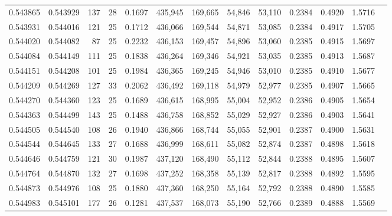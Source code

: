 \begin{tabular}{rrrrrrrrrrrrr}
0.543865 & 0.543929 & 137 &  28 &                                     0.1697 & 435,945 & 169,665 &  54,846 &  53,110 & 0.2384 & 0.4920 & 1.5716 \\
0.543931 & 0.544016 & 121 &  25 &                                     0.1712 & 436,066 & 169,544 &  54,871 &  53,085 & 0.2384 & 0.4917 & 1.5705 \\
0.544020 & 0.544082 &  87 &  25 &                                     0.2232 & 436,153 & 169,457 &  54,896 &  53,060 & 0.2385 & 0.4915 & 1.5697 \\
0.544084 & 0.544149 & 111 &  25 &                                     0.1838 & 436,264 & 169,346 &  54,921 &  53,035 & 0.2385 & 0.4913 & 1.5687 \\
0.544151 & 0.544208 & 101 &  25 &                                     0.1984 & 436,365 & 169,245 &  54,946 &  53,010 & 0.2385 & 0.4910 & 1.5677 \\
0.544209 & 0.544269 & 127 &  33 &                                     0.2062 & 436,492 & 169,118 &  54,979 &  52,977 & 0.2385 & 0.4907 & 1.5665 \\
0.544270 & 0.544360 & 123 &  25 &                                     0.1689 & 436,615 & 168,995 &  55,004 &  52,952 & 0.2386 & 0.4905 & 1.5654 \\
0.544363 & 0.544499 & 143 &  25 &                                     0.1488 & 436,758 & 168,852 &  55,029 &  52,927 & 0.2386 & 0.4903 & 1.5641 \\
0.544505 & 0.544540 & 108 &  26 &                                     0.1940 & 436,866 & 168,744 &  55,055 &  52,901 & 0.2387 & 0.4900 & 1.5631 \\
0.544544 & 0.544645 & 133 &  27 &                                     0.1688 & 436,999 & 168,611 &  55,082 &  52,874 & 0.2387 & 0.4898 & 1.5618 \\
0.544646 & 0.544759 & 121 &  30 &                                     0.1987 & 437,120 & 168,490 &  55,112 &  52,844 & 0.2388 & 0.4895 & 1.5607 \\
0.544764 & 0.544870 & 132 &  27 &                                     0.1698 & 437,252 & 168,358 &  55,139 &  52,817 & 0.2388 & 0.4892 & 1.5595 \\
0.544873 & 0.544976 & 108 &  25 &                                     0.1880 & 437,360 & 168,250 &  55,164 &  52,792 & 0.2388 & 0.4890 & 1.5585 \\
0.544983 & 0.545101 & 177 &  26 &                                     0.1281 & 437,537 & 168,073 &  55,190 &  52,766 & 0.2389 & 0.4888 & 1.5569 \\

\end{tabular}
